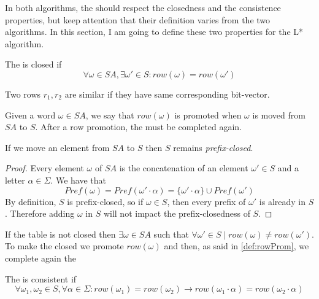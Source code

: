In both algorithms, the \OT should respect the closedness and the consistence properties, but keep attention that their definition varies from the two algorithms. In this section, I am going to define these two properties for the L* algorithm.

\begin{definition}[Closedness]
  The \OT is closed if
  \[\forall \omega \in SA, \exists \omega' \in S: row(\omega) = row(\omega')\]
\end{definition}

\begin{definition} Two rows $r_1, r_2$ are similar if they have same corresponding bit-vector.
\end{definition}

\begin{definition}
  \label{def:rowProm}
  Given a word $\omega \in SA$, we say that $row(\omega)$ is promoted when $\omega$ is moved from $SA$ to $S$. After a row promotion, the \OT must be completed again.
\end{definition}

\begin{lemma}
  \label{lemmaPromoteLinePrefixClosedness}
  If we move an element from $SA$ to $S$ then $S$ remains \textit{prefix-closed}.
\end{lemma}

\begin{proof}
  Every element $\omega$ of $SA$ is the concatenation of an element $\omega' \in S$ and a letter $\alpha \in \Sigma$. We have that
  \[Pref(\omega) = Pref(\omega' \cdot \alpha) = \{\omega' \cdot \alpha\} \cup Pref(\omega')\]
  By definition, $S$ is prefix-closed, so if $\omega \in S$, then every prefix of $\omega'$ is already in $S$. Therefore adding $\omega$ in $S$ will not impact the prefix-closedness of $S$.
\end{proof}

If the table is not closed then $\exists \omega \in SA$ such that $\forall \omega' \in S \mid row(\omega) \neq row(\omega')$. To make the \OT closed we promote $row(\omega)$ and then, as said in \cref{def:rowProm}, we complete again the \OT

\begin{definition}[Consistence]
  The \OT is consistent if
  \[\forall \omega_1,\omega_2 \in S, \forall \alpha \in \Sigma:  row(\omega_1) = row(\omega_2) \rightarrow row(\omega_1 \cdot \alpha) = row(\omega_2 \cdot \alpha)\]
\end{definition}

